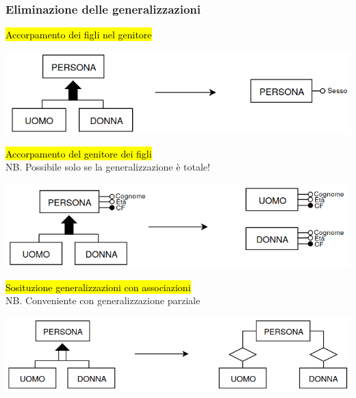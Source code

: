\documentclass[a4paper]{article}
\begin{document}
\subsubsection{Eliminazione delle generalizzazioni}
\hl{Accorpamento dei figli nel genitore}
\begin{center}
      \includegraphics[scale=0.45]{img/pl1.png}
\end{center}
%
\hl{Accorpamento del genitore dei figli}\\
NB. Possibile solo se la generalizzazione è totale!
\begin{center}
      \includegraphics[scale=0.45]{img/pl2.png}
\end{center}
%
\hl{Sosituzione generalizzazioni con associazioni}\\
NB. Conveniente con generalizzazione parziale
\begin{center}
      \includegraphics[scale=0.45]{img/pl3.png}
\end{center}
\end{document}
